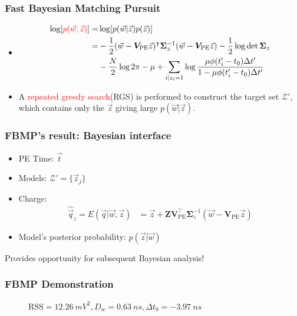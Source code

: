 \documentclass{beamer}
\begin{document}
\begin{CJK*}{UTF8}{gbsn}
\begin{frame}
\frametitle{Fast Bayesian Matching Pursuit}
\begin{itemize}
    \item \begin{align*}
        \log[\textcolor{red}{p(\vec{w},\vec{z})}] =& \log[p(\vec{w}|\vec{z})p(\vec{z})] \\
        =& -\frac{1}{2}(\vec{w}-\bm{V}_\mathrm{PE}\vec{z})^\intercal\bm{\Sigma}_z^{-1}(\vec{w}-\bm{V}_\mathrm{PE}\vec{z})-\frac{1}{2}\log\det\bm{\Sigma}_z \\ 
        &-\frac{N}{2}\log2\pi -\mu + \sum_{i|z_i=1}\log \frac{\mu \phi(t'_i - t_0) \Delta t'}{1-\mu \phi(t'_i - t_0) \Delta t'}
        \end{align*}
    \item A \textcolor{red}{repeated greedy search}(RGS) is performed to construct the target set $\mathcal{Z}'$, which contains only the $\vec{z}$ giving large $p(\vec{w}|\vec{z})$. 
\end{itemize}
\end{frame}

\begin{frame}
\frametitle{FBMP's result: Bayesian interface}
\begin{itemize}
    \item PE Time: $\vec{t}$
    \item Models: $\mathcal{Z}'=\{\vec{z}_j\}$
    \item Charge: \begin{align*}
        \hat{\vec{q}}_z = E(\vec{q}|\vec{w},\vec{z}) &= \vec{z} + \bm{Z}\bm{V}_\mathrm{PE}^\intercal\bm{\Sigma}_z^{-1}(\vec{w}-\bm{V}_\mathrm{PE}\vec{z})
        \end{align*}
    \item Model's posterior probability: $p(\vec{z}|\vec{w})$
\end{itemize}
\begin{center}
    Provides opportunity for subsequent Bayesian analysis! 
\end{center}
\end{frame}

\begin{frame}
\frametitle{FBMP Demonstration}
\begin{figure}
    \centering
    \resizebox{0.6\textwidth}{!}{}
    \caption{$\mathrm{RSS}=\SI{12.26}{mV^2},D_w=\SI{0.63}{ns},\Delta t_0=\SI{-3.97}{ns}$}
\end{figure}
\end{frame}


\end{CJK*}
\end{document}
